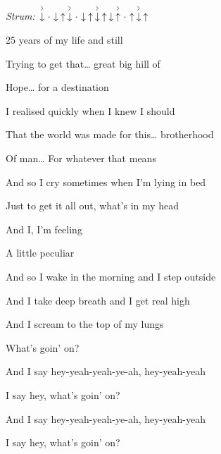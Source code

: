 \begin{song}


\begin{headerbox}
\RaiseBoxWithAccents
{} \quad
\textit{Strum:} $\AccentDown\Miss\Down\Up\AccentDown\Miss\Down\Up\AccentDown\Up\Down\AccentUp\Miss\Up\AccentDown\Up$
\end{headerbox}

\begin{vchordbox}
\end{vchordbox}

\Large

\bigskip

25 years of my life and still \par
{}Trying to get that… great big hill of \par
{}Hope… for a destination \par

\bigskip

I realised quickly when I knew I should \par
That the world was made for this… brotherhood \par
Of man… For whatever that means \par

\bigskip

\begin{chorusbox}{\Chorus}
And so I cry sometimes when I'm lying in bed \par
Just to get it all out, what's in my head \par
And I,  I'm feeling \par
A little peculiar \par

\bigskip

And so I wake in the morning and I step outside \par
And I take deep breath and I get real high \par
And I  scream to the top of my lungs \par
What's goin' on? \par

\bigskip

And I say hey-yeah-yeah-ye-ah, hey-yeah-yeah \par
I say hey, what's goin' on? \par
And I say hey-yeah-yeah-ye-ah, hey-yeah-yeah \par
I say hey, what's goin' on? \par
\end{chorusbox}


\end{song}
